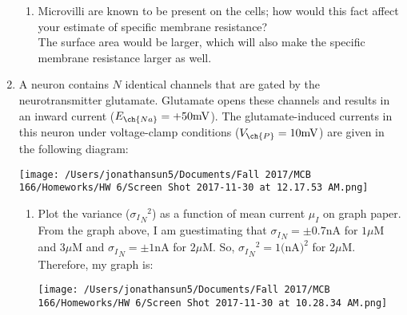 \documentclass[11pt]{article}
\begin{document}
\begin{enumerate}[label=\arabic*.]
\begin{enumerate}[label=(\alph*)]
\item
Microvilli are known to be present on the cells; how would this fact affect your estimate of specific membrane resistance?
\vspace*{1\baselineskip}
\\
The surface area would be larger, which will also make the specific membrane resistance larger as well.
\end{enumerate}



\newpage
\item
A neuron contains $N$ identical channels that are gated by the neurotransmitter glutamate. Glutamate opens these channels and results in an inward  current ($E_{\ch{Na}} = +50 \text{mV}$). The glutamate-induced currents in this neuron under voltage-clamp conditions ($V_{\ch{P}} = 10 \text{mV}$) are given in the following diagram:
\begin{center}
\texttt{[image: /Users/jonathansun5/Documents/Fall 2017/MCB 166/Homeworks/HW 6/Screen Shot 2017-11-30 at 12.17.53 AM.png]}
\end{center}
\begin{enumerate}[label=(\alph*)]
\item
Plot the variance (${{\sigma_{I}}_{N}}^2$) as a function of mean current $\mu_{I}$ on graph paper.
\vspace*{1\baselineskip}
\\
From the graph above, I am guestimating that ${\sigma_{I}}_{N} = \pm0.7 \text{nA}$ for $1 \mu\text{M}$ and $3 \mu\text{M}$ and ${\sigma_{I}}_{N} = \pm1 \text{nA}$ for $2 \mu\text{M}$. So, ${{\sigma_{I}}_{N}} ^ 2 = 1 \text{(nA)}^2$ for $2 \mu\text{M}$. Therefore, my graph is:
\begin{center}
\texttt{[image: /Users/jonathansun5/Documents/Fall 2017/MCB 166/Homeworks/HW 6/Screen Shot 2017-11-30 at 10.28.34 AM.png]}
\end{center}




\end{enumerate}
\end{enumerate}
\end{document}
